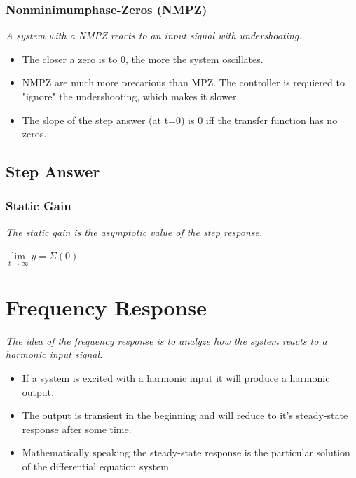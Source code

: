 \documentclass[10pt,a4paper]{scrartcl}
\begin{document}
\begin{multicols*}{3}
	
	
	\subsubsection{Nonminimumphase-Zeros (NMPZ)}
	
	
	\emph{A system with a NMPZ reacts to an input signal with undershooting.}
	
	
	\begin{itemize}
	\compaq
	\item
	The closer a zero is to 0, the more the system oscillates.
	\item
	NMPZ are much more precarious than MPZ. The controller is requiered to "ignore" the undershooting, which makes it slower.
	\item
	The slope of the step answer (at t=0) is 0 iff the transfer function has no zeros.
	
	\end{itemize}
	
	\columnbreak
	
	\subsection{Step Answer}
	
	\subsubsection{Static Gain}
	
	
	\emph{The static gain is the asymptotic value of the step response.}	
	
	$\lim\limits_{t\rightarrow\infty}{y}=\Sigma(0)$
	
	
	
	\section{Frequency Response}
	
	\emph{The idea of the frequency response is to analyze how the system reacts to a harmonic input signal.}
	
	\begin{itemize}
	\compaq
	\item
	If a system is excited with a harmonic input it will produce a harmonic output.
	\item
	The output is transient in the beginning and will reduce to it's steady-state response after some time.
	\item
	Mathematically speaking the steady-state response is the particular solution of the differential equation system. 
	\end{itemize}
	

\end{multicols*}
\end{document}
